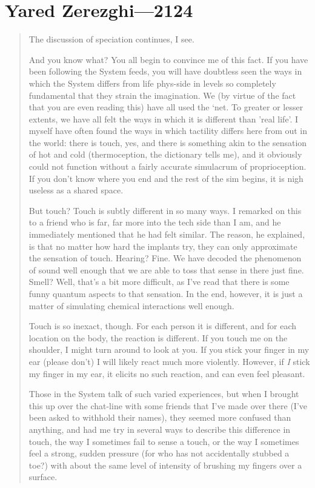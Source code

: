 \hypertarget{yared-zerezghi-2124}{%
\chapter{Yared Zerezghi—2124}\label{yared-zerezghi-2124}}

\begin{quote}
The discussion of speciation continues, I see.

And you know what? You all begin to convince me of this fact. If you have been following the System feeds, you will have doubtless seen the ways in which the System differs from life phys-side in levels so completely fundamental that they strain the imagination. We (by virtue of the fact that you are even reading this) have all used the `net. To greater or lesser extents, we have all felt the ways in which it is different than 'real life'. I myself have often found the ways in which tactility differs here from out in the world: there is touch, yes, and there is something akin to the sensation of hot and cold (thermoception, the dictionary tells me), and it obviously could not function without a fairly accurate simulacrum of proprioception. If you don't know where you end and the rest of the sim begins, it is nigh useless as a shared space.

But touch? Touch is subtly different in so many ways. I remarked on this to a friend who is far, far more into the tech side than I am, and he immediately mentioned that he had felt similar. The reason, he explained, is that no matter how hard the implants try, they can only approximate the sensation of touch. Hearing? Fine. We have decoded the phenomenon of sound well enough that we are able to toss that sense in there just fine. Smell? Well, that's a bit more difficult, as I've read that there is some funny quantum aspects to that sensation. In the end, however, it is just a matter of simulating chemical interactions well enough.

Touch is so inexact, though. For each person it is different, and for each location on the body, the reaction is different. If you touch me on the shoulder, I might turn around to look at you. If you stick your finger in my ear (please don't) I will likely react much more violently. However, if \emph{I} stick my finger in my ear, it elicits no such reaction, and can even feel pleasant.

Those in the System talk of such varied experiences, but when I brought this up over the chat-line with some friends that I've made over there (I've been asked to withhold their names), they seemed more confused than anything, and had me try in several ways to describe this difference in touch, the way I sometimes fail to sense a touch, or the way I sometimes feel a strong, sudden pressure (for who has not accidentally stubbed a toe?) with about the same level of intensity of brushing my fingers over a surface.


\end{quote}
